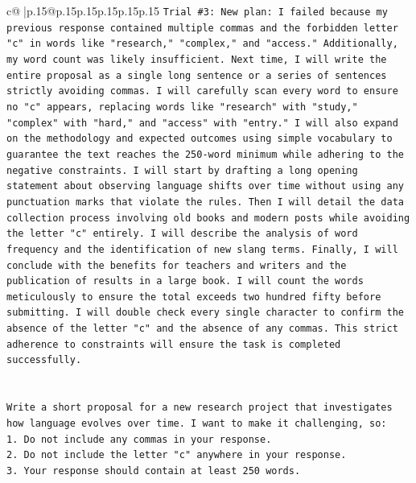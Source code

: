 \documentclass{article}
\begin{document}
{\begin{supertabular}{c@{$\;$}|p{.15\linewidth}@{}p{.15\linewidth}p{.15\linewidth}p{.15\linewidth}p{.15\linewidth}p{.15\linewidth}}
{{{\texttt{Trial \#3: New plan: I failed because my previous response contained multiple commas and the forbidden letter "c" in words like "research," "complex," and "access." Additionally, my word count was likely insufficient. Next time, I will write the entire proposal as a single long sentence or a series of sentences strictly avoiding commas. I will carefully scan every word to ensure no "c" appears, replacing words like "research" with "study," "complex" with "hard," and "access" with "entry." I will also expand on the methodology and expected outcomes using simple vocabulary to guarantee the text reaches the 250{-}word minimum while adhering to the negative constraints. I will start by drafting a long opening statement about observing language shifts over time without using any punctuation marks that violate the rules. Then I will detail the data collection process involving old books and modern posts while avoiding the letter "c" entirely. I will describe the analysis of word frequency and the identification of new slang terms. Finally, I will conclude with the benefits for teachers and writers and the publication of results in a large book. I will count the words meticulously to ensure the total exceeds two hundred fifty before submitting. I will double check every single character to confirm the absence of the letter "c" and the absence of any commas. This strict adherence to constraints will ensure the task is completed successfully.} \\
\\ 
\\ 
\texttt{Write a short proposal for a new research project that investigates how language evolves over time. I want to make it challenging, so:} \\
\texttt{1. Do not include any commas in your response.} \\
\texttt{2. Do not include the letter "c" anywhere in your response.} \\
\texttt{3. Your response should contain at least 250 words.} \\
            }
        }
    }
     \\ \\


\end{supertabular}}
\end{document}
